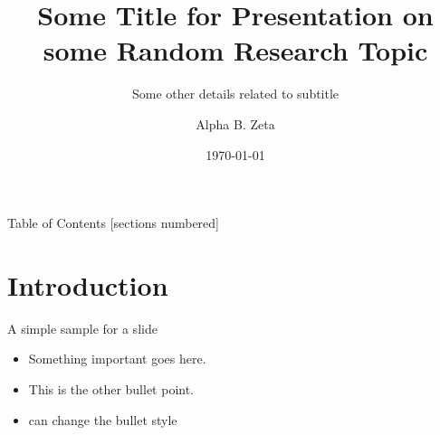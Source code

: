 \documentclass[10pt,xcolor=table]{beamer}
\title[A shorter title]{Some Title for Presentation on some Random Research Topic}
\subtitle[test]{Some other details related to subtitle}
\date{\today}
\author[alphazeta@bu.edu]{Alpha B. Zeta}
\institute[SPTL, BU]{Center for Space Physics, Boston University}
\begin{document}
{
\maketitle
}

%


\begin{frame}[plain]{Table of Contents}
    [sections numbered]
    \tableofcontents[currentsubsection,sectionstyle=show,subsectionstyle=show/shaded]
\end{frame}

\section[Intro]{Introduction}
    \begin{frame}{A simple sample for a slide}
        \begin{itemize}
            \item Something important goes here.
            \item This is the other bullet point.
            \item can change the bullet style
        \end{itemize}
    \end{frame}
    
\end{document}

